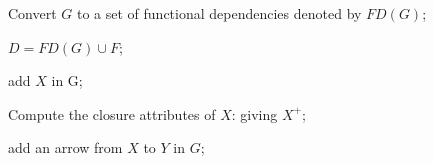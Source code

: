 \DontPrintSemicolon

 Convert $G$ to a set of functional dependencies denoted by $FD(G)$;
 
 $D = FD(G) \cup F$;
 
{
        {
        add $X$ in G; 
        }
    
    Compute the closure attributes of $X$: giving $X^+$;

    {
        {
        add an arrow from $X$ to $Y$ in $G$;
        }
    }
    
        
}
